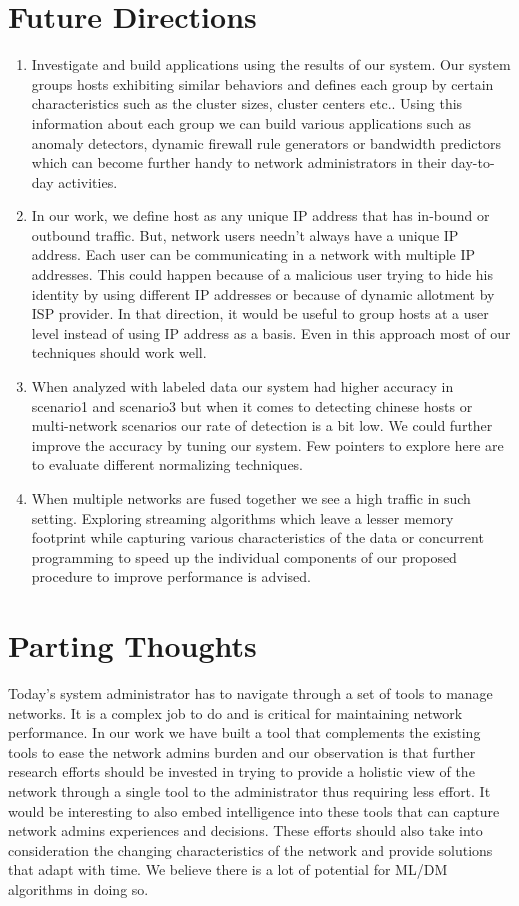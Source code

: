 \section{Future Directions}

\begin{enumerate}
	\item Investigate and build applications using the results of our system. Our system groups hosts exhibiting similar behaviors and defines each group by certain characteristics such as the cluster sizes, cluster centers etc.. Using this information about each group we can build various applications such as anomaly detectors, dynamic firewall rule generators or bandwidth predictors which can become further handy to network administrators in their day-to-day activities.
	
	\item In our work, we define host as any unique IP address that has in-bound or outbound traffic. But, network users needn't always have a unique IP address. Each user can be communicating in a network with multiple IP addresses. This could happen because of a malicious user trying to hide his identity by using different IP addresses or because of dynamic allotment by ISP provider. In that direction, it would be useful to group hosts at a user level instead of using IP address as a basis. Even in this approach most of our techniques should work well. 
	
	\item When analyzed with labeled data our system had higher accuracy in scenario1 and scenario3 but when it comes to detecting chinese hosts or multi-network scenarios our rate of detection is a bit low. We could further improve the accuracy by tuning our system. Few pointers to explore here are to evaluate different normalizing techniques.
	
	\item When multiple networks are fused together we see a high  traffic in such setting. Exploring streaming algorithms \cite{guha2016clustering} which leave a lesser memory footprint while capturing various characteristics of the data or  concurrent programming to speed up the individual components of our proposed procedure to improve performance is advised.
\end{enumerate}


\section{Parting Thoughts}
Today's system administrator has to navigate through a set of tools to manage networks. It is a complex job to do and is critical for maintaining network performance. In our work we have built a tool that complements the existing tools to ease the network admins burden and our observation is that further research efforts should be invested in trying to provide a holistic view of the network through a single tool to the administrator thus requiring less effort. It would be interesting to also embed intelligence into these tools that can capture network admins experiences and decisions. These efforts should also take into consideration the changing characteristics of the network and provide solutions that adapt with time. We believe there is a lot of potential for ML/DM algorithms in doing so.
